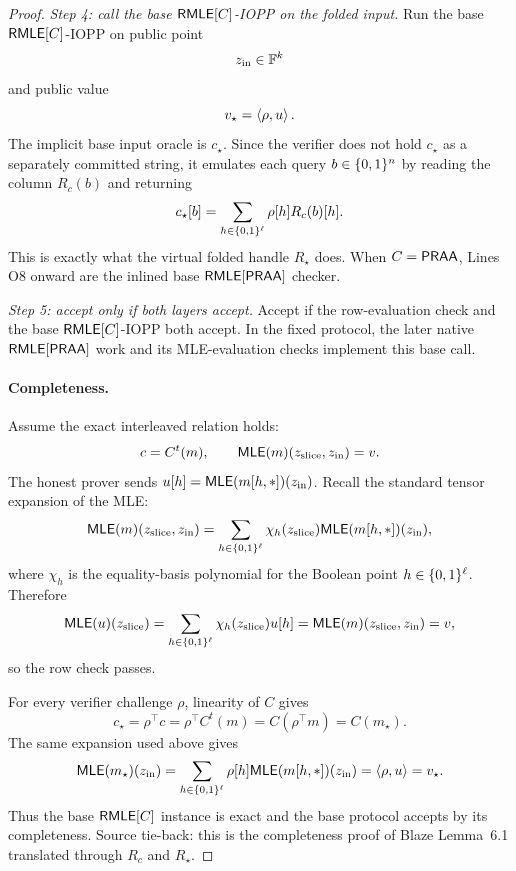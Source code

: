 \begin{proof}
\emph{Step 4: call the base \(\mathsf{RMLE}[C]\)-IOPP on the folded input.}
Run the base \(\mathsf{RMLE}[C]\)-IOPP on public point
\[
  z_{\mathrm{in}}\in\mathbb{F}^k
\]
and public value
\[
  v_\star=\left\langle \rho,u \right\rangle.
\]
The implicit base input oracle is \(c_\star\).  Since the verifier does not
hold \(c_\star\) as a separately committed string, it emulates each query
\(b\in\{0,1\}^n\) by reading the column \(R_c(b)\) and returning
\[
  c_\star[b]=\sum_{h\in\{0,1\}^\ell}\rho[h]R_c(b)[h].
\]
This is exactly what the virtual folded handle \(R_\star\) does.  When
\(C=\mathsf{PRAA}\), Lines O8 onward are the inlined base \(\mathsf{RMLE}[\mathsf{PRAA}]\) checker.

\emph{Step 5: accept only if both layers accept.}
Accept if the row-evaluation check and the base \(\mathsf{RMLE}[C]\)-IOPP both accept.
In the fixed protocol, the later native
\(\mathsf{RMLE}[\mathsf{PRAA}]\) work and its MLE-evaluation checks implement this base call.

\paragraph{Completeness.}
Assume the exact interleaved relation holds:
\[
  c=C^t(m),
  \qquad
  \mathsf{MLE}(m)(z_{\mathrm{slice}},z_{\mathrm{in}})=v.
\]
The honest prover sends \(u[h]=\mathsf{MLE}(m[h,\ast])(z_{\mathrm{in}})\).  Recall the
standard tensor expansion of the MLE:
\[
  \mathsf{MLE}(m)(z_{\mathrm{slice}},z_{\mathrm{in}})
  =
  \sum_{h\in\{0,1\}^\ell}
  \chi_h(z_{\mathrm{slice}})\mathsf{MLE}(m[h,\ast])(z_{\mathrm{in}}),
\]
where \(\chi_h\) is the equality-basis polynomial for the Boolean point
\(h\in\{0,1\}^\ell\).  Therefore
\[
  \mathsf{MLE}(u)(z_{\mathrm{slice}})
  =
  \sum_{h\in\{0,1\}^\ell}\chi_h(z_{\mathrm{slice}})u[h]
  =
  \mathsf{MLE}(m)(z_{\mathrm{slice}},z_{\mathrm{in}})
  =
  v,
\]
so the row check passes.

For every verifier challenge \(\rho\), linearity of \(C\) gives
\[
  c_\star
  =
  \rho^\top c
  =
  \rho^\top C^t(m)
  =
  C(\rho^\top m)
  =
  C(m_\star).
\]
The same expansion used above gives
\[
  \mathsf{MLE}(m_\star)(z_{\mathrm{in}})
  =
  \sum_{h\in\{0,1\}^\ell}\rho[h]\mathsf{MLE}(m[h,\ast])(z_{\mathrm{in}})
  =
  \left\langle \rho,u \right\rangle
  =
  v_\star.
\]
Thus the base \(\mathsf{RMLE}[C]\) instance is exact and the base protocol accepts by
its completeness.  Source tie-back: this is the completeness proof of
Blaze Lemma~6.1 translated through \(R_c\) and \(R_\star\).


\end{proof}
